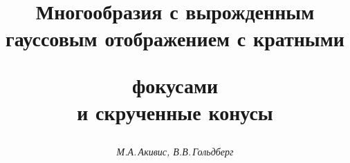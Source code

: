 




%


\newcommand{\eqn}[2]{\begin{equation}\label{e:#1}#2\end{equation}}


\newcommand{\rank}{\operatorname{rank}}


\newcommand{\tts}[1]{}


\renewcommand{\baselinestretch}{0.98}







\setcounter{page}{3}















\author{\it М.А.\,Акивис, В.В.\,Гольдберг}




\title{Многообразия с вырожденным гауссовым отображением с кратными


фокусами\\ и скрученные конусы}





\date{}




\pagestyle{plain} %







\maketitle


